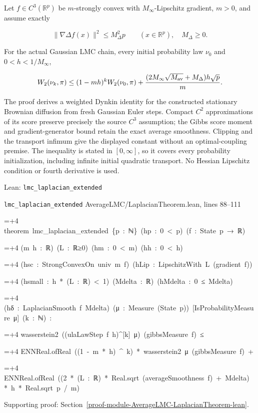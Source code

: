 \documentclass[11pt,a4paper]{report}
\newlength{\leancharwidth}
\newenvironment{leancode}{\par\smallskip\begingroup\ttfamily\footnotesize\raggedright
  \settowidth{\leancharwidth}{M}\setlength{\parskip}{0pt}\setlength{\parindent}{0pt}
  \frenchspacing}{\par\endgroup\smallskip}
\newcommand{\leanline}[2]{\hangindent=\dimexpr#1\leancharwidth+4\leancharwidth\relax
  \hangafter=1\noindent\hspace*{#1\leancharwidth}#2\par}
\newcommand{\leansource}[1]{\par{\footnotesize\color{leanmuted}#1}\par}
\begin{document}
Let \(f\in C^3(\mathbb R^p)\) be \(m\)-strongly
convex with \(M_\infty\)-Lipschitz gradient, \(m>0\), and assume exactly


\[\|\nabla\Delta f(x)\|^2\le M_\Delta^2p\qquad(x\in\mathbb R^p),\quad M_\Delta\ge0.\]


For the actual Gaussian LMC chain, every initial probability law \(\nu_0\)
and \(0<h<1/M_\infty\),


\[W_2(\nu_k,\pi)\le(1-mh)^kW_2(\nu_0,\pi)
+\frac{(2M_\infty\sqrt{M_{\rm av}}+M_\Delta)h\sqrt p}{m}.\]


The proof derives a weighted Dynkin identity for the constructed stationary
Brownian diffusion from fresh Gaussian Euler steps. Compact \(C^2\) approximations
of its score preserve precisely the source \(C^3\) assumption; the Gibbs score
moment and gradient-generator bound retain the exact average smoothness.
Clipping and the transport infimum give the displayed constant without an
optimal-coupling premise. The inequality is stated in \([0,\infty]\), so
it covers every probability initialization, including infinite initial quadratic
transport. No Hessian Lipschitz condition or fourth derivative is used.

\begin{leanbox}{Lean: \texttt{lmc\_\allowbreak{}laplacian\_\allowbreak{}extended}}
\leansource{\texttt{lmc\_\allowbreak{}laplacian\_\allowbreak{}extended} \quad AverageLMC/\allowbreak{}LaplacianTheorem.lean, lines 88–111}
\begin{leancode}
\leanline{0}{theorem\ lmc\_laplacian\_extended\ \{p\ :\ ℕ\}\ (hp\ :\ 0\ <\ p)\ (f\ :\ State\ p\ →\ ℝ)}
\leanline{4}{(m\ h\ :\ ℝ)\ (L\ :\ ℝ≥0)\ (hm\ :\ 0\ <\ m)\ (hh\ :\ 0\ <\ h)}
\leanline{4}{(hsc\ :\ StrongConvexOn\ univ\ m\ f)\ (hLip\ :\ LipschitzWith\ L\ (gradient\ f))}
\leanline{4}{(hsmall\ :\ h\ *\ (L\ :\ ℝ)\ <\ 1)\ (Mdelta\ :\ ℝ)\ (hMdelta\ :\ 0\ ≤\ Mdelta)}
\leanline{4}{(hδ\ :\ LaplacianSmooth\ f\ Mdelta)\ (μ\ :\ Measure\ (State\ p))\ [IsProbabilityMeasure\ μ]\ (k\ :\ ℕ)\ :}
\leanline{4}{wasserstein2\ ((ulaLawStep\ f\ h)\textasciicircum{}[k]\ μ)\ (gibbsMeasure\ f)\ ≤}
\leanline{6}{ENNReal.ofReal\ ((1\ -\ m\ *\ h)\ \textasciicircum{}\ k)\ *\ wasserstein2\ μ\ (gibbsMeasure\ f)\ +}
\leanline{6}{ENNReal.ofReal\ ((2\ *\ (L\ :\ ℝ)\ *\ Real.sqrt\ (averageSmoothness\ f)\ +\ Mdelta)\ *\ h\ *\ Real.sqrt\ p\ /\ m)}
\end{leancode}
\end{leanbox}

{\small\color{gray}Supporting proof: Section~\ref{proof-module-AverageLMC-LaplacianTheorem-lean}.\par}
\end{document}

